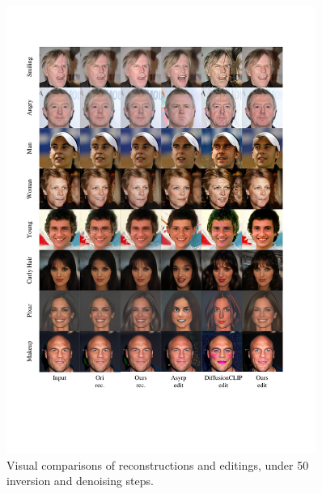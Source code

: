 \documentclass[letterpaper]{article} %
\begin{document}
\begin{figure}[t]
    \centering
    \includegraphics[width=0.9\textwidth]{Figs/fig11.pdf}
    \caption{Visual comparisons of reconstructions and editings, under 50 inversion and denoising steps.}
    \label{fig12}
\end{figure}
\end{document}
